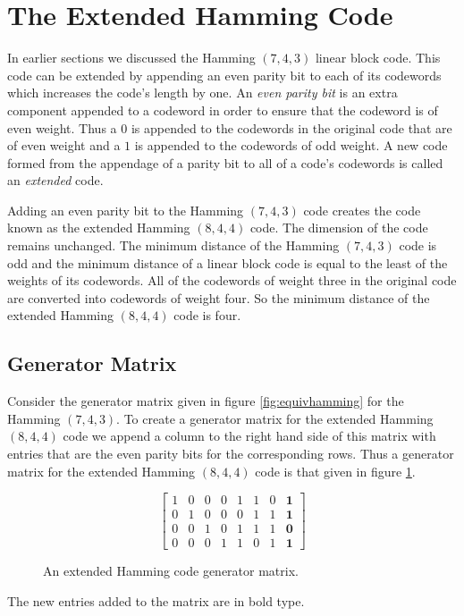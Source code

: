 \section{The Extended Hamming Code}
\label{sect:exthamm}
In earlier sections we discussed the Hamming $(7,4,3)$ linear block code.
This code can be extended by appending an even parity bit to each of its codewords which increases the code's length by one.
An \emph{even parity bit} is an extra component appended to a codeword in order to ensure that the codeword is of even weight.
Thus a $0$ is appended to the codewords in the original code that are of even weight and a $1$ is appended to the codewords of odd weight.
A new code formed from the appendage of a parity bit to all of a code's codewords is called an \emph{extended} code.

Adding an even parity bit to the Hamming $(7,4,3)$ code creates the code known as the extended Hamming $(8,4,4)$ code.
The dimension of the code remains unchanged.
The minimum distance of the Hamming $(7,4,3)$ code is odd and the minimum distance of a linear block code is equal to the least of the weights of its codewords.
All of the codewords of weight three in the original code are converted into codewords of weight four.
So the minimum distance of the extended Hamming $(8,4,4)$ code is four.

\subsection{Generator Matrix}
Consider the generator matrix given in figure \ref{fig:equivhamming} for the Hamming $(7,4,3)$.
To create a generator matrix for the extended Hamming $(8,4,4)$ code we append a column to the right hand side of this matrix with entries that are the even parity bits for the corresponding rows.
Thus a generator matrix for the extended Hamming $(8,4,4)$ code is that given in figure \ref{fig:exthamminggenerator}.
\begin{figure}[htbp]
\begin{center}
\[ \left[ \begin{array}{cccccccc}
1 & 0 & 0 & 0 & 1 & 1 & 0 & \textbf{1} \\
0 & 1 & 0 & 0 & 0 & 1 & 1 & \textbf{1} \\
0 & 0 & 1 & 0 & 1 & 1 & 1 & \textbf{0} \\
0 & 0 & 0 & 1 & 1 & 0 & 1 & \textbf{1}
\end{array} \right] \]
\caption{An extended Hamming code generator matrix.}
\label{fig:exthamminggenerator}
\end{center}
\end{figure}
The new entries added to the matrix are in bold type.

